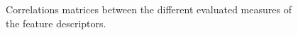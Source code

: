 \begin{figure}
{{		}}
\vspace{-2.0mm}
\addtocounter{subfigure}{-1}
\centerline{%
	}
\vspace{-2.0mm}
\caption{Correlations matrices between the different evaluated measures of the feature descriptors.}
\vspace{-2mm}
\label{fig:depth_comparison_second}
\end{figure}



